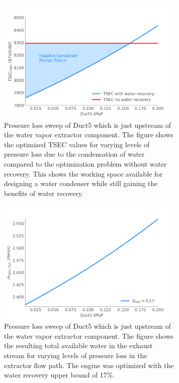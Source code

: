 \documentclass[conf]{new-aiaa}
\begin{document}
\begin{figure}[hbt!]
  \centering
  \begin{subfigure}[t]{0.49\textwidth}
    \includegraphics[width=\textwidth]{N3_dpqp.pdf}
    \caption{Pressure loss sweep of Duct5 which is just upstream of the water vapor extractor component.
      The figure shows the optimized TSEC values for varying levels of pressure loss due to the condensation of water compared to the optimization problem without water recovery.
      This shows the working space available for designing a water condenser while still gaining the benefits of water recovery.}
    \label{fig:dpqp_sweep}
  \end{subfigure}
  \hspace{2pt}
  \begin{subfigure}[t]{0.49\textwidth}
    \includegraphics[width=\textwidth]{N3_wdot.pdf}
    \caption{Pressure loss sweep of Duct5 which is just upstream of the water vapor extractor component.
      The figure shows the resulting total available water in the exhaust stream for varying levels of pressure loss in the extractor flow path.
      The engine was optimized with the water recovery upper bound of 17\%.
    }
    \label{fig:dpqp_wdot}
  \end{subfigure}
  \caption{}
  \label{fig:dpqp_study}
\end{figure}
\end{document}

